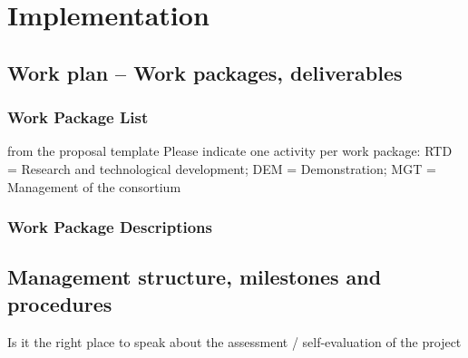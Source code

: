 \chapter{Implementation}\label{chap:implementation}

\section{Work plan -- Work packages, deliverables}



\subsection{Work Package List}\label{sec:wplist}

\begin{todo}{from the proposal template}
Please indicate one activity per work package:
RTD = Research and technological development; DEM = Demonstration; MGT = Management of the consortium
\end{todo}

\wpfigstyle{\footnotesize}

\newpage
\newpage

\subsection{Work Package Descriptions}\label{sec:workpackages}
\begin{workplan}
  
  
  
  
  
  
  
  
  
\end{workplan}
\ganttchart[draft,xscale=.45] 
\newpage\newpage

\section{Management structure, milestones and procedures}

{\color{red} Is it the right place to speak about the assessment /
  self-evaluation of the project}




